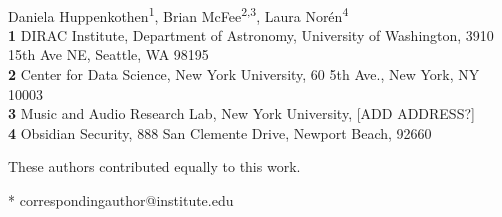 \documentclass[10pt,letterpaper]{article}
\begin{document}
\vspace*{0.2in}

\begin{flushleft}
{\Large
\textbf{} %
}
\newline
\\
Daniela Huppenkothen\textsuperscript{1\Yinyang\textcurrency},
Brian McFee\textsuperscript{2,3\Yinyang},
Laura Nor\'{e}n\textsuperscript{4\Yinyang}
\\
\bigskip
\textbf{1} DIRAC Institute, Department of Astronomy, University of Washington, 3910 15th Ave NE, Seattle, WA 98195 
\\
\textbf{2} Center for Data Science, New York University,  60 5th Ave., New York, NY 10003
\\
\textbf{3} Music and Audio Research Lab, New York University, [ADD ADDRESS?]
\\
\textbf{4} Obsidian Security, 888 San Clemente Drive, Newport Beach, 92660
\\
\bigskip

% 
%
\Yinyang These authors contributed equally to this work.





* correspondingauthor@institute.edu

\end{flushleft}
\end{document}
